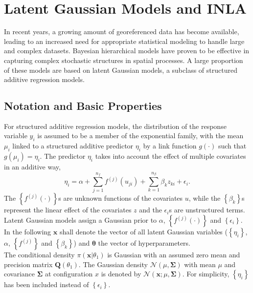 \documentclass[12pt]{book}
\begin{document}
\section{Latent Gaussian Models and INLA}
In recent years, a growing amount of georeferenced data has become available, leading to an increased need for appropriate statistical modeling to handle large and complex datasets. Bayesian hierarchical models have proven to be effective in capturing complex stochastic structures in spatial processes. A large proportion of these models are based on latent Gaussian models, a subclass of structured additive regression models. 
\subsection*{Notation and Basic Properties}
\label{sec:notation}
For structured additive regression models, the distribution of the response variable $y_i$ is assumed to be a member of the exponential family, with the mean $\mu_i$ linked to a structured additive predictor $\eta_i$ by a link function $g\left(\cdot\right)$ such that $g\left(\mu_i\right)=\eta_i$. The predictor $\eta_i$  takes into account the effect of multiple covariates in an additive way,
\begin{equation}\label{eq:predictor}
    \eta_i=\alpha+\sum_{j=1}^{n_f}f^{(j)}\left(u_{ji}\right)+\sum_{k=1}^{n_{\beta}}\beta_kz_{ki}+\epsilon_i.
\end{equation}
The $\left\lbrace f^{(j)}\left(\cdot\right)\right\rbrace$s are unknown functions of the covariates $u$, while the $\left\lbrace\beta_k\right\rbrace$s represent the linear effect of the covariates $z$ and the $\epsilon_i$s are unstructured terms. Latent Gaussian models assign a Gaussian prior to $\alpha$, $\left\lbrace f^{(j)}\left(\cdot\right)\right\rbrace$ and $\left\lbrace\epsilon_i\right\rbrace$. In the following $\pmb{x}$ shall denote the vector of all latent Gaussian variables ($\left\lbrace\eta_i\right\rbrace$, $\alpha$, $\left\lbrace f^{(j)}\right\rbrace$ and $\left\lbrace\beta_k\right\rbrace$) and $\pmb{\theta}$ the vector of hyperparameters. \\
The conditional density $\pi\left(\pmb{x}|\theta_1\right)$ is Gaussian with an assumed zero mean and precision matrix $\pmb{Q}\left(\theta_1\right)$. The Gaussian density $\mathcal{N}\left(\mu,\pmb{\Sigma}\right)$ with mean $\mu$ and covariance $\pmb{\Sigma}$ at configuration $x$ is denoted by $\mathcal{N}\left(\pmb{x};\mu,\pmb{\Sigma}\right)$. For simplicity, $\left\lbrace\eta_i\right\rbrace$ has been included instead of $\left\lbrace\epsilon_i\right\rbrace$. \\
\end{document}

